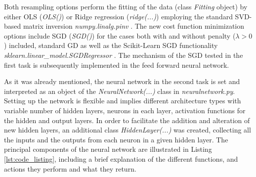 \documentclass{emulateapj}
\begin{document}
Both resampling options perform the fitting of the data (class \textit{Fitting} object) by either OLS (\textit{OLS()}) or Ridge regression (\textit{ridge(...)}) employing the standard SVD-based matrix inversion \textit{numpy.linalg.pinv} \cite{numpy}. The new cost function minimization options include SGD (\textit{SGD()}) for the cases both with and without penalty ($\lambda>0$) included, standard GD as well as the Scikit-Learn SGD functionality \textit{sklearn.linear\_model.SGDRegressor} \cite{skl}. The mechanism of the SGD tested in the first task is subsequently implemented in the feed forward neural network.


As it was already mentioned, the neural network in the second task is set and interpreted as an object of the \textit{NeuralNetwork(...)} class in \textit{neuralnetwork.py}. Setting up the network is flexible and implies different architecture types with variable number of hidden layers, neurons in each layer, activation functions for the hidden and output layers. In order to facilitate the addition and alteration of new hidden layers, an additional class \textit{HiddenLayer(...)} was created, collecting all the inputs and the outputs from each neuron in a given hidden layer. The principal components of the neural network are illustrated in Listing \ref{lst:code_listing}, including a brief explanation of the different functions, and actions they perform and what they return.
\end{document}
